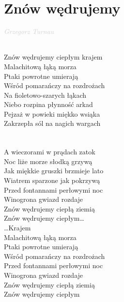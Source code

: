 \documentclass[a5paper, 10pt]{book}
\begin{document}
\section{Znów wędrujemy}\textcolor{lightgray}{\textit{Grzegorz Turnau}}\\~\\
\begin{minipage}[t]{0.8\textwidth}
  Znów wędrujemy ciepłym krajem\\
  Malachitową łąką morza\\
  Ptaki powrotne umierają\\
  Wśród pomarańczy na rozdrożach\\
  \hspace*{4mm}Na fioletowo-szarych łąkach\\
  \hspace*{4mm}Niebo rozpina płynność arkad\\
  \hspace*{4mm}Pejzaż w powieki miękko wsiąka\\
  \hspace*{4mm}Zakrzepła sól na nagich wargach\\
  \\
  \\
  A wieczorami w prądach zatok\\
  Noc liże morze słodką grzywą\\
  Jak miękkie gruszki brzmieje lato\\
  Wiatrem sparzone jak pokrzywą\\
  \hspace*{4mm}Przed fontannami perłowymi noc\\
  \hspace*{4mm}Winogrona gwiazd rozdaje\\
  \hspace*{4mm}Znów wędrujemy ciepłą ziemią\\
  \hspace*{4mm}Znów wędrujemy ciepłym\ldots \\

  \ldots Krajem\\
  Malachitową łąką morza\\
  Ptaki powrotne umierają\\
  Wśród pomarańczy na rozdrożach\\
  \hspace*{4mm}Przed fontannami perłowymi noc\\
  \hspace*{4mm}Winogrona gwiazd rozdaje\\
  \hspace*{4mm}Znów wędrujemy ciepłą ziemią\\
  \hspace*{4mm}Znów wędrujemy ciepłym\\
\end{minipage}
\end{document}
